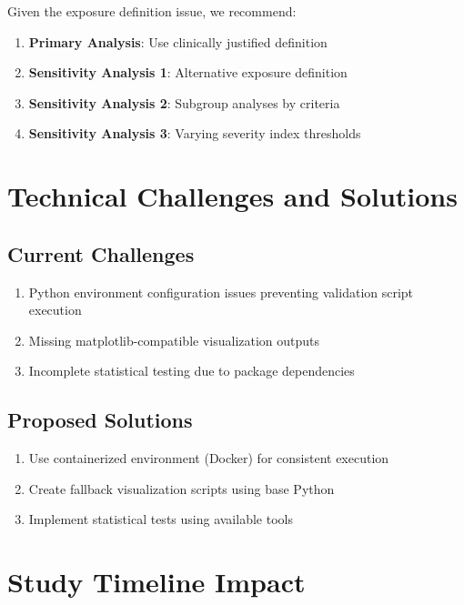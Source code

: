 \documentclass[11pt]{article}
\begin{document}
Given the exposure definition issue, we recommend:

\begin{enumerate}
    \item \textbf{Primary Analysis}: Use clinically justified definition
    \item \textbf{Sensitivity Analysis 1}: Alternative exposure definition
    \item \textbf{Sensitivity Analysis 2}: Subgroup analyses by criteria
    \item \textbf{Sensitivity Analysis 3}: Varying severity index thresholds
\end{enumerate}

\section{Technical Challenges and Solutions}

\subsection{Current Challenges}

\begin{enumerate}
    \item Python environment configuration issues preventing validation script execution
    \item Missing matplotlib-compatible visualization outputs
    \item Incomplete statistical testing due to package dependencies
\end{enumerate}

\subsection{Proposed Solutions}

\begin{enumerate}
    \item Use containerized environment (Docker) for consistent execution
    \item Create fallback visualization scripts using base Python
    \item Implement statistical tests using available tools
\end{enumerate}

\section{Study Timeline Impact}
\end{document}
